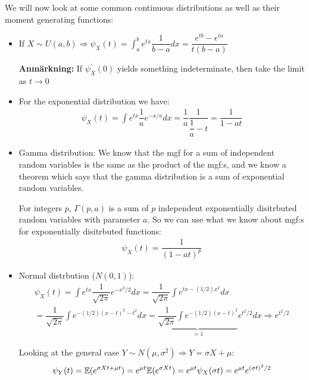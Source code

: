 \par\bigskip
\noindent We will now look at some common continuous distributions as well as their moment generating functions:\par
\begin{itemize}
  \item If $X\sim U(a,b)\Rightarrow \psi_X(t) = \int_{a}^{b}e^{tx}\dfrac{1}{b-a}dx = \dfrac{e^{tb}-e^{ta}}{t(b-a)}$
    \par\bigskip
    \noindent\textbf{Anmärkning:} If $\psi_X^{\prime}(0)$ yields something indeterminate, then take the limit as $t\to0$
    \par\bigskip
  \item For the exponential distribution we have:
    \begin{equation*}
      \begin{gathered}
        \psi_X(t) = \int e^{tx}\dfrac{1}{a}e^{-x/a}dx = \dfrac{1}{a}\dfrac{1}{\dfrac{1}{a}-t} = \dfrac{1}{1-at}
      \end{gathered}
    \end{equation*}
    \par\bigskip
  \item Gamma distribution: We know that the mgf for a sum of independent random variables is the same as the product of the mgf:s, and we know a theorem which says that the gamma distribution is a sum of exponential random variables.\par
    \noindent For integers $p$, $\Gamma(p,a)$ is a sum of $p$ independent exponentially disitrbuted random variables with parameter $a$. So we can use what we know about mgf:s for exponentially disitrbuted functions:
    \begin{equation*}
      \begin{gathered}
        \psi_X(t) = \dfrac{1}{(1-at)^p}
      \end{gathered}
    \end{equation*}
    \par\bigskip
  \item Normal distrbution ($N(0,1)$):
    \begin{equation*}
      \begin{gathered}
        \psi_X(t) =\int e^{tx}\dfrac{1}{\sqrt{2\pi}}e^{-x^2/2}dx = \dfrac{1}{\sqrt{2\pi}}\int e^{tx-(1/2)x^2}dx\\
        = \dfrac{1}{\sqrt{2\pi}}\int e^{-(1/2)(x-t)^2-t^2}dx = \underbrace{\dfrac{1}{\sqrt{2\pi}}\int e^{-(1/2)(x-t)^2}}_{\text{$=1$}}e^{t^2/2}dx\Rightarrow e^{t^2/2}
      \end{gathered}
    \end{equation*}
    \par\bigskip
    \noindent Looking at the general case $Y\sim N(\mu,\sigma^2)\Rightarrow Y = \sigma X+\mu$:
    \begin{equation*}
      \begin{gathered}
        \psi_Y(t) = \mathbb{E}(e^{\sigma Xt+\mu t}) = e^{\mu t}\mathbb{E}(e^{\sigma Xt}) = e^{\mu t}\psi_X(\sigma t) = e^{\mu t}e^{(\sigma t)^2/2}
      \end{gathered}
    \end{equation*}
\end{itemize}

